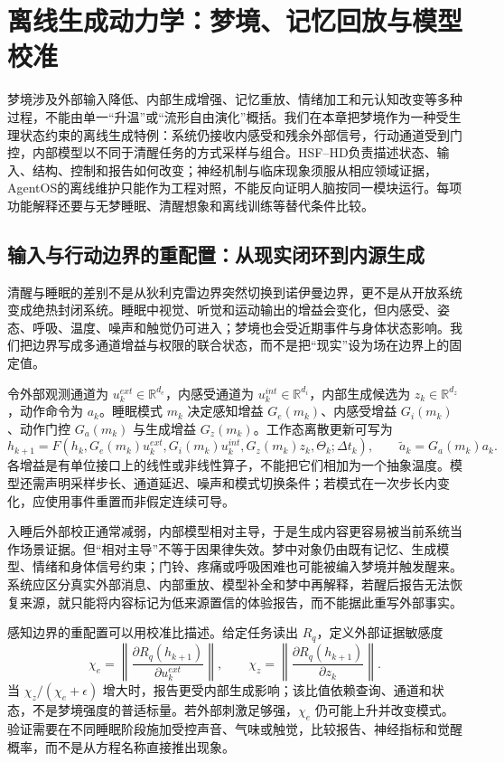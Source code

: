 \chapter{离线生成动力学：梦境、记忆回放与模型校准}
\label{chap:physics_of_dreams}
梦境涉及外部输入降低、内部生成增强、记忆重放、情绪加工和元认知改变等多种过程，不能由单一“升温”或“流形自由演化”概括。我们在本章把梦境作为一种受生理状态约束的离线生成特例：系统仍接收内感受和残余外部信号，行动通道受到门控，内部模型以不同于清醒任务的方式采样与组合。HSF--HD负责描述状态、输入、结构、控制和报告如何改变；神经机制与临床现象须服从相应领域证据，AgentOS的离线维护只能作为工程对照，不能反向证明人脑按同一模块运行。每项功能解释还要与无梦睡眠、清醒想象和离线训练等替代条件比较。

\section{输入与行动边界的重配置：从现实闭环到内源生成}
\label{sec:section_3039}
清醒与睡眠的差别不是从狄利克雷边界突然切换到诺伊曼边界，更不是从开放系统变成绝热封闭系统。睡眠中视觉、听觉和运动输出的增益会变化，但内感受、姿态、呼吸、温度、噪声和触觉仍可进入；梦境也会受近期事件与身体状态影响。我们把边界写成多通道增益与权限的联合状态，而不是把“现实”设为场在边界上的固定值。

令外部观测通道为 $u_k^{ext}\in\mathbb R^{d_e}$，内感受通道为 $u_k^{int}\in\mathbb R^{d_i}$，内部生成候选为 $z_k\in\mathbb R^{d_z}$，动作命令为 $a_k$。睡眠模式 $m_k$ 决定感知增益 $G_e(m_k)$、内感受增益 $G_i(m_k)$、动作门控 $G_a(m_k)$ 与生成增益 $G_z(m_k)$。工作态离散更新可写为
\[
h_{k+1}=F\!\left(h_k,G_e(m_k)u_k^{ext},G_i(m_k)u_k^{int},G_z(m_k)z_k,\Theta_k;\Delta t_k\right),
\qquad
\tilde a_k=G_a(m_k)a_k .
\]
各增益是有单位接口上的线性或非线性算子，不能把它们相加为一个抽象温度。模型还需声明采样步长、通道延迟、噪声和模式切换条件；若模式在一次步长内变化，应使用事件重置而非假定连续可导。

入睡后外部校正通常减弱，内部模型相对主导，于是生成内容更容易被当前系统当作场景证据。但“相对主导”不等于因果律失效。梦中对象仍由既有记忆、生成模型、情绪和身体信号约束；门铃、疼痛或呼吸困难也可能被编入梦境并触发醒来。系统应区分真实外部消息、内部重放、模型补全和梦中再解释，若醒后报告无法恢复来源，就只能将内容标记为低来源置信的体验报告，而不能据此重写外部事实。

感知边界的重配置可以用校准比描述。给定任务读出 $R_q$，定义外部证据敏感度
\[
\chi_e=\left\|\frac{\partial R_q(h_{k+1})}{\partial u_k^{ext}}\right\|,
\qquad
\chi_z=\left\|\frac{\partial R_q(h_{k+1})}{\partial z_k}\right\|.
\]
当 $\chi_z/\left(\chi_e+\epsilon\right)$ 增大时，报告更受内部生成影响；该比值依赖查询、通道和状态，不是梦境强度的普适标量。若外部刺激足够强，$\chi_e$ 仍可能上升并改变模式。验证需要在不同睡眠阶段施加受控声音、气味或触觉，比较报告、神经指标和觉醒概率，而不是从方程名称直接推出现象。

